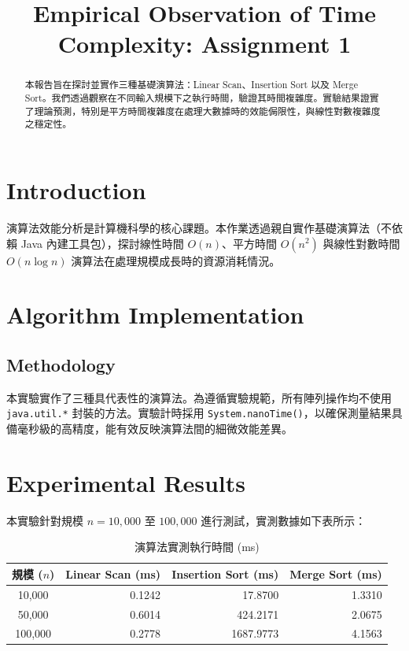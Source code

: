 \documentclass[conference]{IEEEtran}
\begin{document}
\title{Empirical Observation of Time Complexity: Assignment 1}

\author{
}

\maketitle

\begin{abstract}
本報告旨在探討並實作三種基礎演算法：Linear Scan、Insertion Sort 以及 Merge Sort。我們透過觀察在不同輸入規模下之執行時間，驗證其時間複雜度。實驗結果證實了理論預測，特別是平方時間複雜度在處理大數據時的效能侷限性，與線性對數複雜度之穩定性。
\end{abstract}

\section{Introduction}
演算法效能分析是計算機科學的核心課題。本作業透過親自實作基礎演算法（不依賴 Java 內建工具包），探討線性時間 $O(n)$、平方時間 $O(n^2)$ 與線性對數時間 $O(n \log n)$ 演算法在處理規模成長時的資源消耗情況。

\section{Algorithm Implementation}
\subsection{Methodology}
本實驗實作了三種具代表性的演算法。為遵循實驗規範，所有陣列操作均不使用 \texttt{java.util.*} 封裝的方法。實驗計時採用 \texttt{System.nanoTime()}，以確保測量結果具備毫秒級的高精度，能有效反映演算法間的細微效能差異。

\section{Experimental Results}
本實驗針對規模 $n=10,000$ 至 $100,000$ 進行測試，實測數據如下表所示：

\begin{table}[htbp]
\caption{演算法實測執行時間 (ms)}
\centering
\begin{tabular}{crrr}
\toprule
規模 ($n$) & Linear Scan (ms) & Insertion Sort (ms) & Merge Sort (ms) \\
\midrule
10,000  & 0.1242 & 17.8700 & 1.3310 \\
50,000  & 0.6014 & 424.2171 & 2.0675 \\
100,000 & 0.2778 & 1687.9773 & 4.1563 \\
\bottomrule
\end{tabular}
\end{table}
\end{document}
